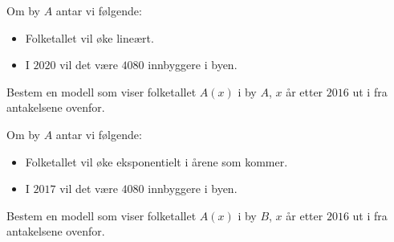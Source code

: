 Om by $A$ antar vi følgende:
%
\begin{itemize}
  \item Folketallet vil øke lineært.
  \item I $2020$ vil det være $\num{4080}$ innbyggere i byen.
\end{itemize}

\begin{oppgaver}
   Bestem en modell som viser folketallet $A(x)$ i by $A$, $x$ år
    etter $2016$ ut i fra antakelsene ovenfor.
\end{oppgaver}

Om by $A$ antar vi følgende:
%
\begin{itemize}
    \item Folketallet vil øke eksponentielt i årene som kommer.
    \item I $2017$ vil det være $\num{4080}$ innbyggere i byen.
\end{itemize}

\begin{oppgaver}
     Bestem en modell som viser folketallet $A(x)$ i by $B$, $x$ år
    etter $2016$ ut i fra antakelsene ovenfor.
\end{oppgaver}
